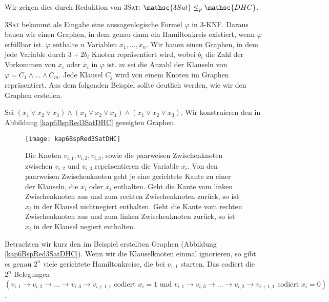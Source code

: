 \begin{Bew}
  \hspace{\parindent}Wir zeigen dies durch Reduktion von \textsc{3Sat}: $\mathsc{3Sat}  \le_p \mathsc{DHC}$.
  
  \textsc{3Sat} bekommt als Eingabe eine aussagenlogische Formel $\varphi$ in 3-KNF. Daraus bauen wir einen Graphen, in dem genau dann ein Hamiltonkreis existiert, wenn $\varphi$ erfüllbar ist. $\varphi$ enthalte $n$ Variablen $x_1, \ldots, x_n$. Wir bauen einen Graphen, in dem jede Variable durch $3 + 2 b_i$ Knoten repräsentiert wird, wobei $b_i$ die Zahl der Vorkommen von $x_i$ oder $\overline{x}_i$ in $\varphi$ ist. $m$ sei die Anzahl der Klauseln von $\varphi = C_1 \wedge \ldots \wedge C_m$. Jede Klausel $C_j$ wird von einem Knoten im Graphen repräsentiert. Aus dem folgenden Beispiel sollte deutlich werden, wie wir den Graphen erstellen.

  \begin{Bsp}
    \hspace{\parindent} Sei $(x_1 \vee \overline{x}_2 \vee x_3) \wedge (\overline{x}_1 \vee x_2 \vee \overline{x}_4) \wedge (\overline{x}_1 \vee \overline{x}_2 \vee \overline{x}_3)$. Wir konstruieren den in Abbildung \vref{kap6BspRed3SatDHC} gezeigten Graphen.
    
    \begin{figure}[htb]
      \centering
      \texttt{[image: kap6BspRed3SatDHC]}
      \caption{Die Knoten $v_{i,1}, v_{i,2}, v_{i,3}$, sowie die paarweisen Zwischenknoten zwischen $v_{i,2}$ und $v_{i,3}$ repräsentieren die Variable $x_i$. Von den paarweisen Zwischenknoten geht je eine gerichtete Kante zu einer der Klauseln, die $x_i$ oder $\overline{x}_i$ enthalten. Geht die Kante vom linken Zwischenknoten aus und zum rechten Zwischenknoten zurück, so ist $x_i$ in der Klausel nichtnegiert enthalten. Geht die Kante vom rechten Zwischenknoten aus und zum linken Zwischenknoten zurück, so ist $x_i$ in der Klausel negiert enthalten.}
      \label{kap6BspRed3SatDHC}
    \end{figure}
  \end{Bsp}
  
  Betrachten wir kurz den im Beispiel erstellten Graphen (Abbildung \vref{kap6BspRed3SatDHC}). Wenn wir die Klauselknoten einmal ignorieren, so gibt es genau $2^n$ viele gerichtete Hamiltonkreise, die bei $v_{1,1}$ starten. Das codiert die $2^n$ Belegungen $(v_{i,1} \rightarrow v_{i,2} \rightarrow \ldots \rightarrow v_{i,3} \rightarrow v_{i+1,1} \text{ codiert } x_i = 1 \text{ und } v_{i,1} \rightarrow v_{i,3} \rightarrow \ldots \rightarrow v_{i,2} \rightarrow v_{i+1,1} \text{ codiert } x_i=0)$.
  

\end{Bew}
